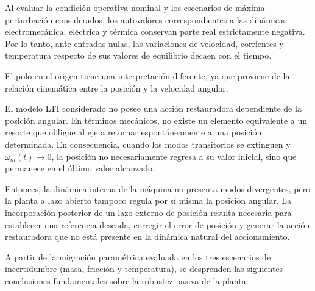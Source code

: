 \documentclass[10pt,a4paper]{article}
\begin{document}
Al evaluar la condición operativa nominal y los escenarios de máxima
perturbación considerados, los autovalores correspondientes a las dinámicas
electromecánica, eléctrica y térmica conservan parte real estrictamente
negativa. Por lo tanto, ante entradas nulas, las variaciones de velocidad,
corrientes y temperatura respecto de sus valores de equilibrio decaen con el
tiempo.

El polo en el origen tiene una interpretación diferente, ya que proviene de
la relación cinemática entre la posición y la velocidad angular.

El modelo LTI considerado no posee una
acción restauradora dependiente de la posición angular. En términos
mecánicos, no existe un elemento equivalente a un resorte que obligue al eje
a retornar espontáneamente a una posición determinada.  En consecuencia, cuando los modos transitorios se extinguen y
$\omega_m(t)\rightarrow 0$, la posición no necesariamente regresa a su valor
inicial, sino que permanece en el último valor alcanzado.

Entonces, la dinámica interna de la máquina no presenta modos
divergentes, pero la planta a lazo abierto tampoco regula por sí misma la
posición angular. La incorporación posterior de un lazo externo de posición
resulta necesaria para establecer una referencia deseada, corregir el error
de posición y generar la acción restauradora que no está presente en la
dinámica natural del accionamiento.

A partir de la migración paramétrica evaluada en los tres escenarios de incertidumbre (masa, fricción y temperatura), se desprenden las siguientes conclusiones fundamentales sobre la robustez pasiva de la planta:
\end{document}
